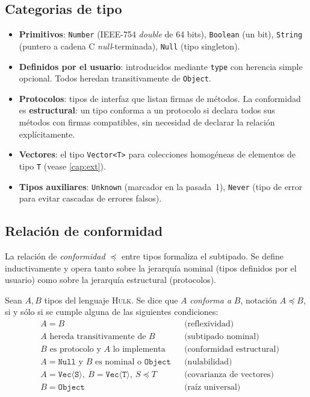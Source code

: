 \documentclass[11pt,a4paper,oneside,openany]{report}
\newcommand{\hulk}{\textsc{Hulk}}
\newcommand{\code}[1]{\texttt{#1}}
\begin{document}
\subsection{Categorias de tipo}

\begin{itemize}
  \item \textbf{Primitivos}: \code{Number} (IEEE-754 \textit{double} de 64 bits),
    \code{Boolean} (un bit), \code{String} (puntero a cadena C
    \textit{null}-terminada), \code{Null} (tipo singleton).
  \item \textbf{Definidos por el usuario}: introducidos mediante \code{type} con
    herencia simple opcional. Todos heredan transitivamente de \code{Object}.
  \item \textbf{Protocolos}: tipos de interfaz que listan firmas de métodos. La
    conformidad es \textbf{estructural}: un tipo conforma a un protocolo si declara
    todos sus métodos con firmas compatibles, sin necesidad de declarar la
    relación explícitamente.
  \item \textbf{Vectores}: el tipo \code{Vector<T>} para colecciones homogéneas de
    elementos de tipo \code{T} (vease \cref{cap:ext}).
  \item \textbf{Tipos auxiliares}: \code{Unknown} (marcador en la pasada~1),
    \code{Never} (tipo de error para evitar cascadas de errores falsos).
\end{itemize}

\subsection{Relación de conformidad}

La relación de \textit{conformidad} $\preceq$ entre tipos formaliza el subtipado.
Se define inductivamente y opera tanto sobre la jerarquía nominal (tipos definidos
por el usuario) como sobre la jerarquía estructural (protocolos).

\begin{definition}[title={Definición: conformidad de tipos}]
Sean $A, B$ tipos del lenguaje \hulk{}. Se dice que $A$ \emph{conforma a} $B$,
notación $A \preceq B$, si y sólo si se cumple alguna de las siguientes condiciones:
\begin{align*}
  & A = B
  && \text{(reflexividad)} \\
  & A \text{ hereda transitivamente de } B
  && \text{(subtipado nominal)} \\
  & B \text{ es protocolo y } A \text{ lo implementa}
  && \text{(conformidad estructural)} \\
  & A = \mathtt{Null} \text{ y } B \text{ es nominal o } \mathtt{Object}
  && \text{(nulabilidad)} \\
  & A = \mathtt{Vec\langle S\rangle},\ B = \mathtt{Vec\langle T\rangle},\ S \preceq T
  && \text{(covarianza de vectores)} \\
  & B = \mathtt{Object}
  && \text{(raíz universal)}
\end{align*}
\end{definition}
\end{document}
